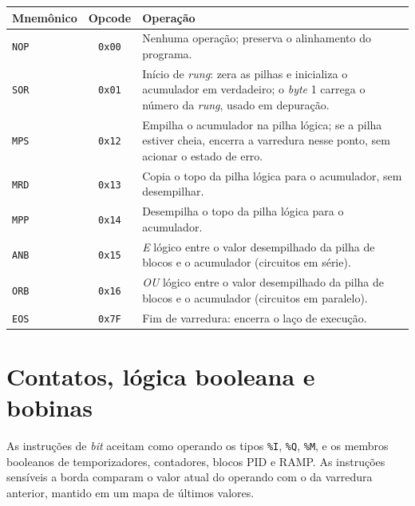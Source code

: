 \begin{quadrofixo}
    \centering
    \begin{tabular}{|l|c|p{9.4cm}|}
        \hline
        Mnemônico & Opcode & Operação \\
        \hline
        \texttt{NOP} & \texttt{0x00} & Nenhuma operação; preserva o alinhamento do programa. \\
        \hline
        \texttt{SOR} & \texttt{0x01} & Início de \textit{rung}: zera as pilhas e inicializa o acumulador em verdadeiro; o \textit{byte} 1 carrega o número da \textit{rung}, usado em depuração. \\
        \hline
        \texttt{MPS} & \texttt{0x12} & Empilha o acumulador na pilha lógica; se a pilha estiver cheia, encerra a varredura nesse ponto, sem acionar o estado de erro. \\
        \hline
        \texttt{MRD} & \texttt{0x13} & Copia o topo da pilha lógica para o acumulador, sem desempilhar. \\
        \hline
        \texttt{MPP} & \texttt{0x14} & Desempilha o topo da pilha lógica para o acumulador. \\
        \hline
        \texttt{ANB} & \texttt{0x15} & \textit{E} lógico entre o valor desempilhado da pilha de blocos e o acumulador (circuitos em série). \\
        \hline
        \texttt{ORB} & \texttt{0x16} & \textit{OU} lógico entre o valor desempilhado da pilha de blocos e o acumulador (circuitos em paralelo). \\
        \hline
        \texttt{EOS} & \texttt{0x7F} & Fim de varredura: encerra o laço de execução. \\
        \hline
    \end{tabular}
    \label{qua:ape-fluxo}
\end{quadrofixo}

\section{Contatos, lógica booleana e bobinas}
\label{sec:ape-isa-bit}

As instruções de \textit{bit} aceitam como operando os tipos \texttt{\%I}, \texttt{\%Q}, \texttt{\%M}, e os membros booleanos de temporizadores, contadores, blocos PID e RAMP.
As instruções sensíveis a borda comparam o valor atual do operando com o da varredura anterior, mantido em um mapa de últimos valores.

